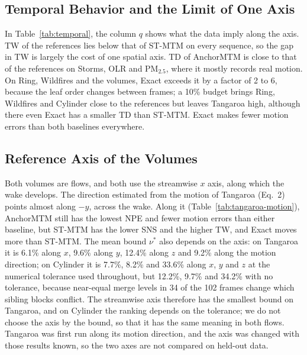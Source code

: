 \documentclass[preprint]{vgtc}
\begin{document}
\subsection{Temporal Behavior and the Limit of One Axis}

In Table~\ref{tab:temporal}, the column $q$ shows what the data imply along the axis. TW of the references lies below that of ST-MTM on every sequence, so the gap in TW is largely the cost of one spatial axis. TD of AnchorMTM is close to that of the references on Storms, OLR and PM$_{2.5}$, where it mostly records real motion. On Ring, Wildfires and the volumes, Exact exceeds it by a factor of 2 to 6, because the leaf order changes between frames; a 10\% budget brings Ring, Wildfires and Cylinder close to the references but leaves Tangaroa high, although there even Exact has a smaller TD than ST-MTM. Exact makes fewer motion errors than both baselines everywhere.

\subsection{Reference Axis of the Volumes}\label{sec:volume-axis}

Both volumes are flows, and both use the streamwise $x$ axis, along which the wake develops. The direction estimated from the motion of Tangaroa (Eq.~2) points almost along $-y$, across the wake. Along it (Table~\ref{tab:tangaroa-motion}), AnchorMTM still has the lowest NPE and fewer motion errors than either baseline, but ST-MTM has the lower SNS and the higher TW, and Exact moves more than ST-MTM. The mean bound $\nu^*$ also depends on the axis: on Tangaroa it is 6.1\% along $x$, 9.6\% along $y$, 12.4\% along $z$ and 9.2\% along the motion direction; on Cylinder it is 7.7\%, 8.2\% and 33.6\% along $x$, $y$ and $z$ at the numerical tolerance used throughout, but 12.2\%, 9.7\% and 34.2\% with no tolerance, because near-equal merge levels in 34 of the 102 frames change which sibling blocks conflict. The streamwise axis therefore has the smallest bound on Tangaroa, and on Cylinder the ranking depends on the tolerance; we do not choose the axis by the bound, so that it has the same meaning in both flows. Tangaroa was first run along its motion direction, and the axis was changed with those results known, so the two axes are not compared on held-out data.
\end{document}
